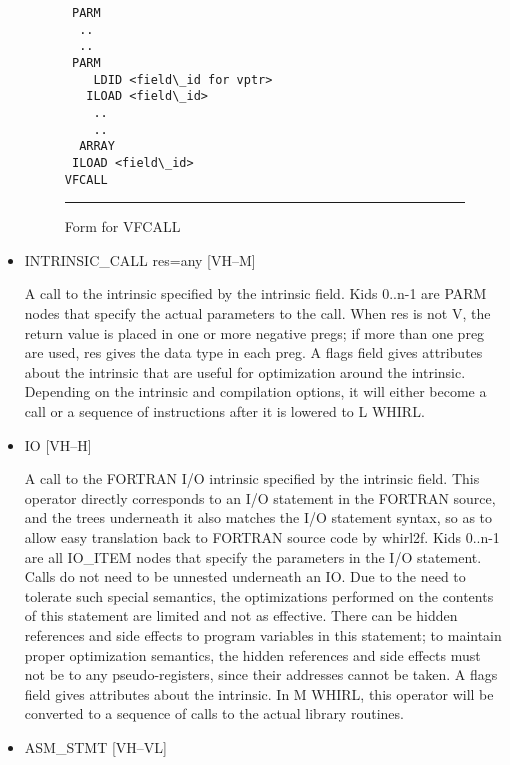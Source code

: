 \documentclass{article}
\begin{document}
\begin{itemize}
\begin{figure}
\begin{center}
\begin{minipage}{4in}
\begin{verbatim}
 PARM
  ..
  ..
 PARM
    LDID <field\_id for vptr>
   ILOAD <field\_id> 
    ..
    ..
  ARRAY
 ILOAD <field\_id> 
VFCALL
\end{verbatim}
\end{minipage}
\end{center}
\hrule
\caption{Form for VFCALL}
\label{vfcall-form}
\end{figure}


\item  INTRINSIC\_CALL res=any  \hfill [VH--M]

A call to the intrinsic specified by the intrinsic field. Kids
0..n-1 are PARM nodes that specify the actual parameters to the
call. When res is not V, the return value is placed in one or more
negative pregs; if more
than one preg are used, res gives the data type in each preg. A
flags field gives attributes about the intrinsic that are useful
for optimization around the intrinsic. Depending on the intrinsic
and compilation options, it will either become a call or a sequence
of instructions after it is lowered to L WHIRL. 

\item  IO \hfill [VH--H]

A call to the FORTRAN I/O intrinsic specified by the intrinsic
field. This operator directly corresponds to an I/O statement in
the FORTRAN
source, and the trees underneath it also matches the I/O statement
syntax, so as to allow easy translation back to FORTRAN source code
by whirl2f. Kids 0..n-1 are all IO\_ITEM nodes that specify the
parameters in the I/O statement. Calls do not need to be unnested
underneath an IO. Due to the need to tolerate such special semantics, the
optimizations performed on the contents of this statement are
limited and not as effective. There can be hidden references and
side effects to program variables in this statement; to maintain
proper optimization semantics, the hidden references and side
effects must not be to any pseudo-registers, since their addresses
cannot be taken. A flags field gives attributes about the intrinsic.
In M WHIRL, this operator will be converted to a sequence of calls
to the actual library routines. 

\item  ASM\_STMT \hfill [VH--VL]


\end{itemize}
\end{document}
